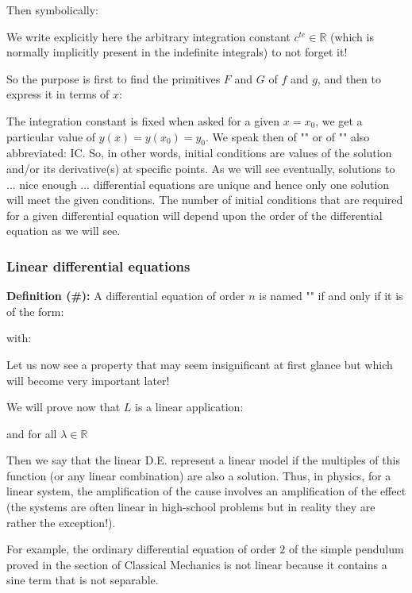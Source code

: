 	Then symbolically:
	
	\begin{tcolorbox}[title=Remark,colframe=black,arc=10pt]
	We write explicitly here the arbitrary integration constant $c^{te} \in \mathbb{R}$ (which is normally implicitly present in the indefinite integrals) to not forget it!
	\end{tcolorbox}
	So the purpose is first to find the primitives $F$ and $G$ of $f$ and $g$, and then to express it in terms of $x$:
	
	The integration constant is fixed when asked for a given $x=x_0$, we get a particular value of $y(x)=y(x_0)=y_0$. We speak then of "" or of "\label{initial conditions}" also abbreviated: IC. So, in other words, initial conditions are values of the solution and/or its derivative(s) at specific points.  As we will see eventually, solutions to ... nice enough ... differential equations are unique and hence only one solution will meet the given conditions. The number of initial conditions that are required for a given differential equation will depend upon the order of the differential equation as we will see.
	
	\subsubsection{Linear differential equations}\label{linear differential equations}
	\textbf{Definition (\#\mydef):} A differential equation of order $n$ is named "" if and only if it is of the form:
	
	with:
	
	Let us now see a property that may seem insignificant at first glance but which will become very important later!
	
	We will prove now that $L$ is a linear application:
	
	and for all $\lambda \in \mathbb{R}$
	
	Then we say that the linear D.E. represent a linear model if the multiples of this function (or any linear combination) are also a solution. Thus, in physics, for a linear system, the amplification of the cause involves an amplification of the effect (the systems are often linear in high-school problems but in reality they are rather the exception!).
	
	For example, the ordinary differential equation of order $2$ of the simple pendulum proved in the section of Classical Mechanics is not linear because it contains a sine term that is not separable.

